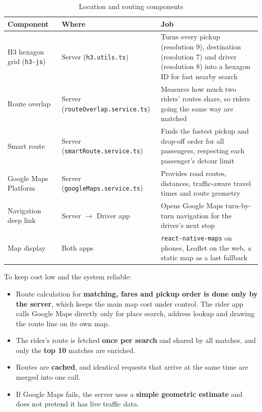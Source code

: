 \begin{table}[H]
  \centering
  \small
  \caption{Location and routing components}
  \label{tab:location-components}
  \begin{tabularx}{\textwidth}{@{}p{3.2cm}p{3.6cm}L@{}}
    \toprule
    \textbf{Component} & \textbf{Where} & \textbf{Job} \\
    \midrule
    H3 hexagon grid (\texttt{h3-js}) & Server (\texttt{h3.utils.ts}) & Turns every pickup (resolution 9), destination (resolution 7) and driver (resolution 8) into a hexagon ID for fast nearby search \\
    Route overlap & Server (\texttt{routeOverlap.service.ts}) & Measures how much two riders' routes share, so riders going the same way are matched \\
    Smart route & Server (\texttt{smartRoute.service.ts}) & Finds the fastest pickup and drop-off order for all passengers, respecting each passenger's detour limit \\
    Google Maps Platform & Server (\texttt{googleMaps.service.ts}) & Provides road routes, distances, traffic-aware travel times and route geometry \\
    Navigation deep link & Server $\rightarrow$ Driver app & Opens Google Maps turn-by-turn navigation for the driver's next stop \\
    Map display & Both apps & \texttt{react-native-maps} on phones, Leaflet on the web, a static map as a last fallback \\
    \bottomrule
  \end{tabularx}
\end{table}

To keep cost low and the system reliable:

\begin{itemize}
  \item Route calculation for \textbf{matching, fares and pickup order is done
        only by the server}, which keeps the main map cost under control. The
        rider app calls Google Maps directly only for place search, address
        lookup and drawing the route line on its own map.
  \item The rider's route is fetched \textbf{once per search} and shared by all
        matches, and only the \textbf{top 10} matches are enriched.
  \item Routes are \textbf{cached}, and identical requests that arrive at the
        same time are merged into one call.
  \item If Google Maps fails, the server uses a \textbf{simple geometric
        estimate} and does not pretend it has live traffic data.
\end{itemize}

